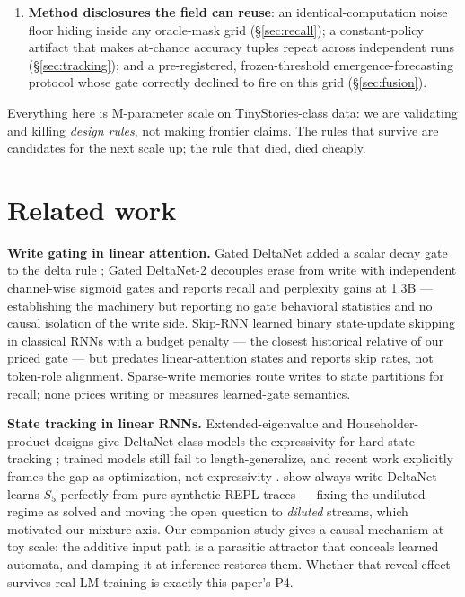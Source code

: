 \documentclass[10pt]{article}
\begin{document}
\begin{enumerate}
($\tgProdDnDiff$ / $\tgProdMtDiff$, both $2$--$3\times$ the frozen margin) and suppress our
operation tokens out-of-distribution --- production-scale training discovers hygiene without a
price, killing our own naive scaled proposal by its pre-registered go/no-go rule.
\item \textbf{Method disclosures the field can reuse}: an identical-computation noise floor hiding
inside any oracle-mask grid (\S\ref{sec:recall}); a constant-policy artifact that makes at-chance
accuracy tuples repeat across independent runs (\S\ref{sec:tracking}); and a pre-registered,
frozen-threshold emergence-forecasting protocol whose gate correctly declined to fire on this grid
(\S\ref{sec:fusion}).
\end{enumerate}

Everything here is \tgParamsM{}M-parameter scale on TinyStories-class data: we are validating and
killing \emph{design rules}, not making frontier claims. The rules that survive are candidates for
the next scale up; the rule that died, died cheaply.

\section{Related work}
\textbf{Write gating in linear attention.} Gated DeltaNet \citep{yang2025gateddeltanet} added a
scalar decay gate to the delta rule \citep{yang2024deltanet}; Gated DeltaNet-2
\citep{hatamizadeh2026gdn2} decouples erase from write with independent channel-wise sigmoid gates
and reports recall and perplexity gains at 1.3B --- establishing the machinery but reporting no gate
behavioral statistics and no causal isolation of the write side. Skip-RNN \citep{campos2018skiprnn}
learned binary state-update skipping in classical RNNs with a budget penalty --- the closest
historical relative of our priced gate --- but predates linear-attention states and reports skip
rates, not token-role alignment. Sparse-write memories \citep{pan2025sse,xiao2026ramnet} route
writes to state partitions for recall; none prices writing or measures learned-gate semantics.

\textbf{State tracking in linear RNNs.} Extended-eigenvalue and Householder-product designs give
DeltaNet-class models the expressivity for hard state tracking
\citep{grazzi2025negative,siems2025deltaproduct}; trained models still fail to length-generalize,
and recent work explicitly frames the gap as optimization, not expressivity
\citep{siems2026codestate,buitrago2025length,terzic2025pdssm}. \citet{siems2026codestate} show
always-write DeltaNet learns $S_5$ perfectly from pure synthetic REPL traces --- fixing the
undiluted regime as solved and moving the open question to \emph{diluted} streams, which motivated
our mixture axis. Our companion study \citep{howe2026automaton} gives a causal mechanism at toy
scale: the additive input path is a parasitic attractor that conceals learned automata, and damping
it at inference restores them. Whether that reveal effect survives real LM training is exactly this
paper's P4.
\end{document}
